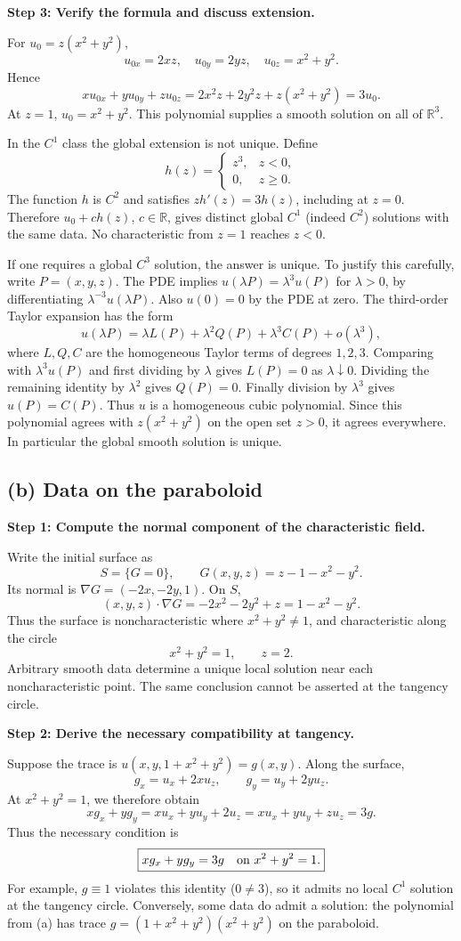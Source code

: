 \documentclass[11pt,a4paper]{article}
\newcommand{\R}{\mathbb R}
\newcommand{\step}[1]{\par\medskip\textbf{#1}\par}
\newcommand{\answer}[1]{\begin{equation*}\boxed{\displaystyle #1}\end{equation*}}
\begin{document}
\step{Step 3: Verify the formula and discuss extension.}
For $u_0=z(x^2+y^2)$,
\[
 u_{0x}=2xz,\quad u_{0y}=2yz,\quad u_{0z}=x^2+y^2.
\]
Hence
\[
 xu_{0x}+yu_{0y}+zu_{0z}
 =2x^2z+2y^2z+z(x^2+y^2)=3u_0.
\]
At $z=1$, $u_0=x^2+y^2$. This polynomial supplies a smooth solution on all of $\R^3$.

In the $C^1$ class the global extension is not unique. Define
\[
 h(z)=\begin{cases}z^3,&z<0,\\0,&z\ge0.\end{cases}
\]
The function $h$ is $C^2$ and satisfies $zh'(z)=3h(z)$, including at $z=0$. Therefore $u_0+c h(z)$, $c\in\R$, gives distinct global $C^1$ (indeed $C^2$) solutions with the same data. No characteristic from $z=1$ reaches $z<0$.

If one requires a global $C^3$ solution, the answer is unique. To justify this carefully, write $P=(x,y,z)$. The PDE implies $u(\lambda P)=\lambda^3u(P)$ for $\lambda>0$, by differentiating $\lambda^{-3}u(\lambda P)$. Also $u(0)=0$ by the PDE at zero. The third-order Taylor expansion has the form
\[
 u(\lambda P)=\lambda L(P)+\lambda^2Q(P)+\lambda^3C(P)+o(\lambda^3),
\]
where $L,Q,C$ are the homogeneous Taylor terms of degrees $1,2,3$. Comparing with $\lambda^3u(P)$ and first dividing by $\lambda$ gives $L(P)=0$ as $\lambda\downarrow0$. Dividing the remaining identity by $\lambda^2$ gives $Q(P)=0$. Finally division by $\lambda^3$ gives $u(P)=C(P)$. Thus $u$ is a homogeneous cubic polynomial. Since this polynomial agrees with $z(x^2+y^2)$ on the open set $z>0$, it agrees everywhere. In particular the global smooth solution is unique.

\subsection*{(b) Data on the paraboloid}
\step{Step 1: Compute the normal component of the characteristic field.}
Write the initial surface as
\[
 S=\{G=0\},\qquad G(x,y,z)=z-1-x^2-y^2.
\]
Its normal is $\nabla G=(-2x,-2y,1)$. On $S$,
\[
 (x,y,z)\cdot\nabla G=-2x^2-2y^2+z=1-x^2-y^2.
\]
Thus the surface is noncharacteristic where $x^2+y^2\ne1$, and characteristic along the circle
\[
 x^2+y^2=1,\qquad z=2.
\]
Arbitrary smooth data determine a unique local solution near each noncharacteristic point. The same conclusion cannot be asserted at the tangency circle.

\step{Step 2: Derive the necessary compatibility at tangency.}
Suppose the trace is $u(x,y,1+x^2+y^2)=g(x,y)$. Along the surface,
\[
 g_x=u_x+2xu_z,\qquad g_y=u_y+2yu_z.
\]
At $x^2+y^2=1$, we therefore obtain
\[
 xg_x+yg_y=xu_x+yu_y+2u_z
          =xu_x+yu_y+zu_z=3g.
\]
Thus the necessary condition is
\answer{xg_x+yg_y=3g\quad\hbox{on }x^2+y^2=1.}
For example, $g\equiv1$ violates this identity ($0\ne3$), so it admits no local $C^1$ solution at the tangency circle. Conversely, some data do admit a solution: the polynomial from (a) has trace $g=(1+x^2+y^2)(x^2+y^2)$ on the paraboloid.
\end{document}
